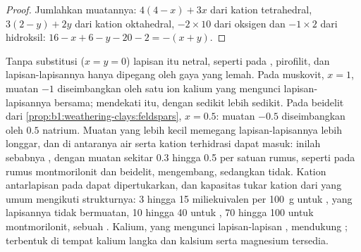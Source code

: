 \begin{proof}
Jumlahkan muatannya: $4(4 - x) + 3x$ dari kation tetrahedral, $3(2 - y) + 2y$
dari kation oktahedral, $-2\times10$ dari oksigen dan $-1\times2$ dari
hidroksil: $16 - x + 6 - y - 20 - 2 = -(x + y)$.
\end{proof}

Tanpa substitusi ($x = y = 0$) lapisan itu netral, seperti pada ,  pirofilit, dan lapisan-lapisannya hanya dipegang oleh gaya yang lemah.
Pada muskovit, $x = 1$, muatan $-1$ diseimbangkan oleh satu ion kalium yang mengunci lapisan-lapisannya bersama;  mendekati itu, dengan sedikit lebih sedikit. Pada beidelit dari \cref{prop:b1:weathering-clays:feldspars}, $x = 0.5$: muatan $-0.5$ diseimbangkan oleh $0.5$ natrium. Muatan yang lebih kecil memegang lapisan-lapisannya lebih longgar, dan di antaranya air serta kation terhidrasi dapat masuk: inilah sebabnya , dengan muatan sekitar 0.3 hingga 0.5 per satuan rumus, seperti pada rumus montmorilonit dan beidelit, mengembang, sedangkan  tidak.
Kation antarlapisan pada  dapat dipertukarkan, dan kapasitas tukar kation dari  yang umum mengikuti strukturnya: 3 hingga 15 miliekuivalen per \qty{100}{g} untuk , yang lapisannya tidak bermuatan, 10 hingga 40 untuk , 70 hingga 100 untuk montmorilonit, sebuah . Kalium, yang mengunci lapisan-lapisan , mendukung ;  terbentuk di tempat kalium langka dan kalsium serta magnesium tersedia.

